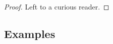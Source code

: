 \documentclass[a4paper, 12pt]{article}
\begin{document}
\begin{proof}
    Left to a curious reader.
\end{proof}
\subsection{Examples}\label{polinomials}
\end{document}
